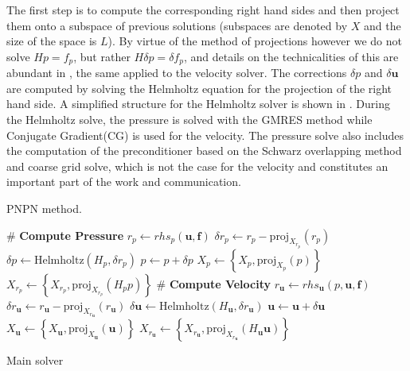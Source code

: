 \documentclass{sig-alternate}
\begin{document}
The first step is to compute the corresponding right hand sides and then project them onto a subspace of previous solutions (subspaces are denoted by $X$ and the size of the space is $L$). By virtue of the method of projections however we do not solve $Hp=f_p$, but rather $H\delta p=\delta f_p$, and details on the technicalities of this are abundant in \cite{Fischer1998}, the same applied to the velocity solver. 
The corrections $\delta p$ and $\delta \mathbf{u}$ are computed by solving the Helmholtz equation for the projection of the right hand side. A simplified structure for the Helmholtz solver is shown in . During the Helmholtz solve, the pressure is solved with the GMRES method while Conjugate Gradient(CG) is used for the velocity. The pressure solve also includes the computation of the preconditioner based on the Schwarz overlapping method and coarse grid solve, which is not the case for the velocity and constitutes an important part of the work and communication.
\begin{algorithm}
\caption{PNPN method.}
\begin{algorithmic}
 
\State \# \textbf{Compute Pressure}
\State $r_p \leftarrow rhs_p(\mathbf{u}, \mathbf{f})$ 
\State $\delta r_p \leftarrow r_p - \text{proj}_{X_{r_p}}(r_p)$ 
\State $\delta p \leftarrow \text{Helmholtz}(H_p,\delta r_p)$ 
\State $p \leftarrow p + \delta p$ 
\State $X_p \leftarrow \left\{ X_p, \text{proj}_{X_{p}}(p) \right\}$ 
\State $X_{r_p} \leftarrow \left\{ X_{r_p}, \text{proj}_{X_{r_p}}(H_p p) \right\}$ 
\State \# \textbf{Compute Velocity}
\State $r_{\mathbf{u}} \leftarrow rhs_{\mathbf{u}}(p, \mathbf{u}, \mathbf{f})$ 
\State $\delta r_{\mathbf{u}} \leftarrow r_{\mathbf{u}} - \text{proj}_{X_{r_{\mathbf{u}}}}(r_{\mathbf{u}})$ 
\State $\delta {\mathbf{u}} \leftarrow \text{Helmholtz}(H_{\mathbf{u}},\delta r_{\mathbf{u}})$ 
\State ${\mathbf{u}} \leftarrow \mathbf{u} + \delta \mathbf{u}$ 
\State $X_{\mathbf{u}} \leftarrow \left\{ X_{\mathbf{u}}, \text{proj}_{X_{\mathbf{u}}}(\mathbf{u}) \right\}$ 
\State $X_{r_{\mathbf{u}}} \leftarrow \left\{ X_{r_{\mathbf{u}}}, \text{proj}_{X_{r_\mathbf{u}}}(H_{\mathbf{u}} \mathbf{u}) \right\}$ 
\EndFor
\EndProcedure
\end{algorithmic}\label{alg:code_struct}
\caption{Main solver}
\end{algorithm}
\end{document}
